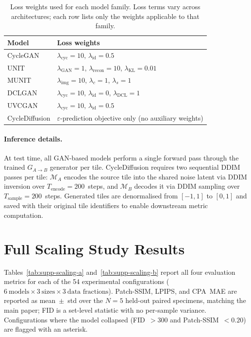 \begin{table}[h]
\centering
\caption{Loss weights used for each model family. Loss terms vary across
architectures; each row lists only the weights applicable to that family.}
\label{tab:supp-loss-weights}
\begin{tabular}{ll}
\toprule
\textbf{Model} & \textbf{Loss weights} \\
\midrule
CycleGAN       & $\lambda_{\mathrm{cyc}}{=}10$, $\lambda_{\mathrm{id}}{=}0.5$ \\
UNIT           & $\lambda_{\mathrm{GAN}}{=}1$, $\lambda_{\mathrm{recon}}{=}10$, $\lambda_{\mathrm{KL}}{=}0.01$ \\
MUNIT          & $\lambda_{\mathrm{img}}{=}10$, $\lambda_{c}{=}1$, $\lambda_{s}{=}1$ \\
DCLGAN         & $\lambda_{\mathrm{cyc}}{=}10$, $\lambda_{\mathrm{id}}{=}0$, $\lambda_{\mathrm{DCL}}{=}1$ \\
UVCGAN         & $\lambda_{\mathrm{cyc}}{=}10$, $\lambda_{\mathrm{id}}{=}0.5$ \\
CycleDiffusion & $\varepsilon$-prediction objective only (no auxiliary weights) \\
\bottomrule
\end{tabular}
\end{table}

\paragraph{Inference details.}
At test time, all GAN-based models perform a single forward pass through the
trained $G_{A \to B}$ generator per tile.
CycleDiffusion requires two sequential DDIM passes per tile: $\mathcal{M}_A$
encodes the source tile into the shared noise latent via DDIM inversion over
$T_{\mathrm{encode}}{=}200$~steps, and $\mathcal{M}_B$ decodes
it via DDIM sampling over $T_{\mathrm{sample}}{=}200$~steps.
Generated tiles are denormalised from $[-1,1]$ to $[0,1]$ and saved with their
original tile identifiers to enable downstream metric computation.


\section{Full Scaling Study Results}
\label{sec:supp-full-results}

Tables~\ref{tab:supp-scaling-a} and~\ref{tab:supp-scaling-b} report all four
evaluation metrics for each of the 54 experimental configurations
($6~\text{models} \times 3~\text{sizes} \times 3~\text{data fractions}$).
Patch-SSIM, LPIPS, and CPA~MAE are reported as mean~$\pm$~std over the $N{=}5$
held-out paired specimens, matching the main paper; FID is a set-level statistic
with no per-sample variance.
Configurations where the model collapsed (FID~$>300$ and Patch-SSIM~$<0.20$)
are flagged with an asterisk.

